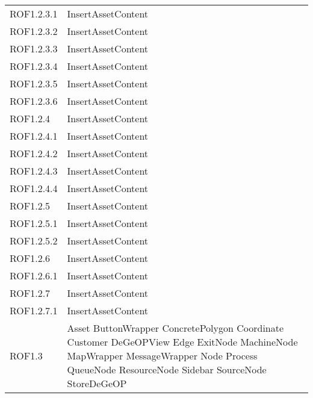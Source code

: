 \begin{longtable}{p{2.5cm}!{\VRule[1pt]}p{5cm}}
	ROF1.2.3.1 & InsertAssetContent\\
	ROF1.2.3.2 & InsertAssetContent\\
	ROF1.2.3.3 & InsertAssetContent\\
	ROF1.2.3.4 & InsertAssetContent\\
	ROF1.2.3.5 & InsertAssetContent\\
	ROF1.2.3.6 & InsertAssetContent\\
	ROF1.2.4 & InsertAssetContent\\
	ROF1.2.4.1 & InsertAssetContent\\
	ROF1.2.4.2 & InsertAssetContent\\
	ROF1.2.4.3 & InsertAssetContent\\
	ROF1.2.4.4 & InsertAssetContent\\
	ROF1.2.5 & InsertAssetContent\\
	ROF1.2.5.1 & InsertAssetContent\\
	ROF1.2.5.2 & InsertAssetContent\\
	ROF1.2.6 & InsertAssetContent\\
	ROF1.2.6.1 & InsertAssetContent\\
	ROF1.2.7 & InsertAssetContent\\
	ROF1.2.7.1 & InsertAssetContent\\
	ROF1.3 & Asset \newline ButtonWrapper \newline ConcretePolygon \newline Coordinate \newline Customer \newline DeGeOPView \newline Edge \newline ExitNode \newline MachineNode \newline MapWrapper \newline MessageWrapper \newline Node \newline Process \newline QueueNode \newline ResourceNode \newline Sidebar \newline SourceNode \newline StoreDeGeOP\\

\end{longtable}
